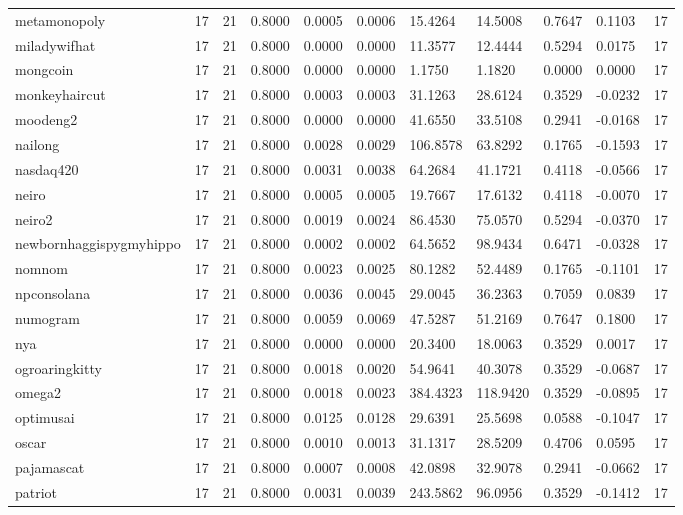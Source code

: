 \begin{table}[htbp]
\begin{tabular}{lllllllllll}
metamonopoly & 17 & 21 & 0.8000 & 0.0005 & 0.0006 & 15.4264 & 14.5008 & 0.7647 & 0.1103 & 17 \\
miladywifhat & 17 & 21 & 0.8000 & 0.0000 & 0.0000 & 11.3577 & 12.4444 & 0.5294 & 0.0175 & 17 \\
mongcoin & 17 & 21 & 0.8000 & 0.0000 & 0.0000 & 1.1750 & 1.1820 & 0.0000 & 0.0000 & 17 \\
monkeyhaircut & 17 & 21 & 0.8000 & 0.0003 & 0.0003 & 31.1263 & 28.6124 & 0.3529 & -0.0232 & 17 \\
moodeng2 & 17 & 21 & 0.8000 & 0.0000 & 0.0000 & 41.6550 & 33.5108 & 0.2941 & -0.0168 & 17 \\
nailong & 17 & 21 & 0.8000 & 0.0028 & 0.0029 & 106.8578 & 63.8292 & 0.1765 & -0.1593 & 17 \\
nasdaq420 & 17 & 21 & 0.8000 & 0.0031 & 0.0038 & 64.2684 & 41.1721 & 0.4118 & -0.0566 & 17 \\
neiro & 17 & 21 & 0.8000 & 0.0005 & 0.0005 & 19.7667 & 17.6132 & 0.4118 & -0.0070 & 17 \\
neiro2 & 17 & 21 & 0.8000 & 0.0019 & 0.0024 & 86.4530 & 75.0570 & 0.5294 & -0.0370 & 17 \\
newbornhaggispygmyhippo & 17 & 21 & 0.8000 & 0.0002 & 0.0002 & 64.5652 & 98.9434 & 0.6471 & -0.0328 & 17 \\
nomnom & 17 & 21 & 0.8000 & 0.0023 & 0.0025 & 80.1282 & 52.4489 & 0.1765 & -0.1101 & 17 \\
npconsolana & 17 & 21 & 0.8000 & 0.0036 & 0.0045 & 29.0045 & 36.2363 & 0.7059 & 0.0839 & 17 \\
numogram & 17 & 21 & 0.8000 & 0.0059 & 0.0069 & 47.5287 & 51.2169 & 0.7647 & 0.1800 & 17 \\
nya & 17 & 21 & 0.8000 & 0.0000 & 0.0000 & 20.3400 & 18.0063 & 0.3529 & 0.0017 & 17 \\
ogroaringkitty & 17 & 21 & 0.8000 & 0.0018 & 0.0020 & 54.9641 & 40.3078 & 0.3529 & -0.0687 & 17 \\
omega2 & 17 & 21 & 0.8000 & 0.0018 & 0.0023 & 384.4323 & 118.9420 & 0.3529 & -0.0895 & 17 \\
optimusai & 17 & 21 & 0.8000 & 0.0125 & 0.0128 & 29.6391 & 25.5698 & 0.0588 & -0.1047 & 17 \\
oscar & 17 & 21 & 0.8000 & 0.0010 & 0.0013 & 31.1317 & 28.5209 & 0.4706 & 0.0595 & 17 \\
pajamascat & 17 & 21 & 0.8000 & 0.0007 & 0.0008 & 42.0898 & 32.9078 & 0.2941 & -0.0662 & 17 \\
patriot & 17 & 21 & 0.8000 & 0.0031 & 0.0039 & 243.5862 & 96.0956 & 0.3529 & -0.1412 & 17 \\

\end{tabular}
\end{table}
